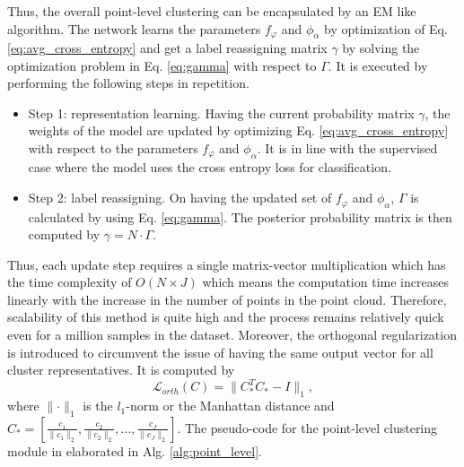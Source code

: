Thus, the overall point-level clustering can be encapsulated by an \ac{EM} like algorithm. The network learns the parameters $f_{\varphi}$ and $\mathcal{\phi}_{\alpha}$ by optimization of Eq.\ref{eq:avg_cross_entropy} and get a label reassigning matrix $\gamma$ by solving the optimization problem in Eq. \ref{eq:gamma} with respect to $\Gamma$. It is executed by performing the following steps in repetition. 
\begin{itemize}
    \item Step 1: representation learning. Having the current probability matrix $\gamma$, the weights of the model are updated by optimizing Eq. \ref{eq:avg_cross_entropy} with respect to the  parameters $f_{\varphi}$ and $\mathcal{\phi}_{\alpha}$. It is in line with the supervised case where the model uses the cross entropy loss for classification. 
    \item Step 2: label reassigning. On having the updated set of $f_{\varphi}$ and $\mathcal{\phi}_{\alpha}$, $\Gamma$ is calculated by using Eq. \ref{eq:gamma}. The posterior probability matrix is then computed by $\gamma = \mathit{N} \cdot \Gamma$.
\end{itemize}
Thus, each update step requires a single matrix-vector multiplication which has the time complexity of $O(\mathit{N \times J})$ which means the computation time increases linearly with the increase in the number of points in the point cloud. Therefore, scalability of this method is quite high and the process remains relatively quick even for a million samples in the dataset. Moreover, the orthogonal regularization is introduced to circumvent the issue of having the same output vector for all cluster representatives. It is computed by 
\begin{equation}
    \label{eq:orth}
    \mathcal{L}_{\mathit{orth}}(\mathit{C}) = \lVert \mathit{C_{*}^{T} C_{*} - I} \rVert _{1},
\end{equation}
where $ \lVert \cdot \rVert _1 $ is the $l_{1}$-norm or the Manhattan distance and $\mathit{C_{*}} = [ \frac{c_1}{\lVert c_1 \rVert _{2}}, \frac{c_2}{\lVert c_2 \rVert _{2}}, ... , \frac{c_{\mathit{J}}}{\lVert c_{\mathit{J}} \rVert _{2}}]$. The pseudo-code for the point-level clustering module in elaborated in Alg. \ref{alg:point_level}.

